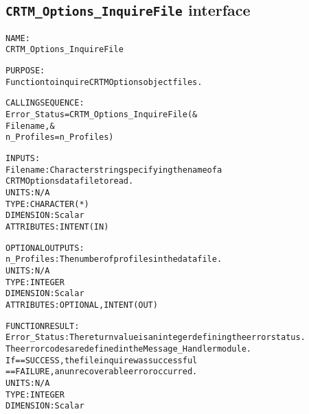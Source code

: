 \subsection{\texttt{CRTM\_Options\_InquireFile} interface}
  \label{sec:CRTM_Options_InquireFile_interface}
  \begin{alltt}
 
  NAME:
        CRTM_Options_InquireFile
 
  PURPOSE:
        Function to inquire CRTM Options object files.
 
  CALLING SEQUENCE:
        Error_Status = CRTM_Options_InquireFile( &
                         Filename               , &
                         n_Profiles = n_Profiles  )
 
  INPUTS:
        Filename:       Character string specifying the name of a
                        CRTM Options data file to read.
                        UNITS:      N/A
                        TYPE:       CHARACTER(*)
                        DIMENSION:  Scalar
                        ATTRIBUTES: INTENT(IN)
 
  OPTIONAL OUTPUTS:
        n_Profiles:     The number of profiles in the data file.
                        UNITS:      N/A
                        TYPE:       INTEGER
                        DIMENSION:  Scalar
                        ATTRIBUTES: OPTIONAL, INTENT(OUT)
 
  FUNCTION RESULT:
        Error_Status:   The return value is an integer defining the error status.
                        The error codes are defined in the Message_Handler module.
                        If == SUCCESS, the file inquire was successful
                           == FAILURE, an unrecoverable error occurred.
                        UNITS:      N/A
                        TYPE:       INTEGER
                        DIMENSION:  Scalar
 
  \end{alltt}
